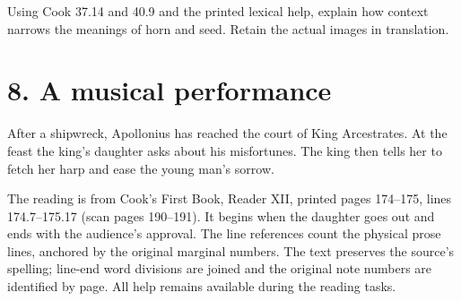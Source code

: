 Using Cook 37.14 and 40.9 and the printed lexical help, explain how context narrows the meanings of horn and seed. Retain the actual images in translation.




\section*{8. A musical performance}

After a shipwreck, Apollonius has reached the court of King Arcestrates. At the feast the king’s daughter asks about his misfortunes. The king then tells her to fetch her harp and ease the young man’s sorrow.

The reading is from Cook’s First Book, Reader XII, printed pages 174–175, lines 174.7–175.17 (scan pages 190–191). It begins when the daughter goes out and ends with the audience’s approval. The line references count the physical prose lines, anchored by the original marginal numbers. The text preserves the source’s spelling; line-end word divisions are joined and the original note numbers are identified by page. All help remains available during the reading tasks.

